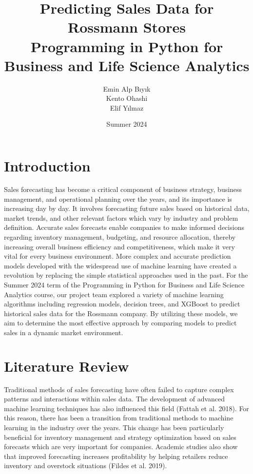 \documentclass[12pt]{report}
\title{\textbf{Predicting Sales Data for Rossmann Stores}\\
\large Programming in Python for Business and Life Science Analytics}
\author{
    Emin Alp Bıyık \\
    Kento Ohashi \\
    Elif Yılmaz
}
\date{Summer 2024}
\begin{document}
\maketitle

\chapter{Introduction}
Sales forecasting has become a critical component of business strategy, business management, and operational planning over the years, and its importance is increasing day by day. It involves forecasting future sales based on historical data, market trends, and other relevant factors which vary by industry and problem definition. Accurate sales forecasts enable companies to make informed decisions regarding inventory management, budgeting, and resource allocation, thereby increasing overall business efficiency and competitiveness, which make it very vital for every business environment. More complex and accurate prediction models developed with the widespread use of machine learning have created a revolution by replacing the simple statistical approaches used in the past. For the Summer 2024 term of the Programming in Python for Business and Life Science Analytics course, our project team explored a variety of machine learning algorithms including regression models, decision trees, and XGBoost to predict historical sales data for the Rossmann company. By utilizing these models, we aim to determine the most effective approach by comparing models to predict sales in a dynamic market environment.

\chapter{Literature Review}
Traditional methods of sales forecasting have often failed to capture complex patterns and interactions within sales data. The development of advanced machine learning techniques has also influenced this field (Fattah et al. 2018). For this reason, there has been a transition from traditional methods to machine learning in the industry over the years. This change has been particularly beneficial for inventory management and strategy optimization based on sales forecasts which are very important for companies. Academic studies also show that improved forecasting increases profitability by helping retailers reduce inventory and overstock situations (Fildes et al. 2019).
\end{document}
